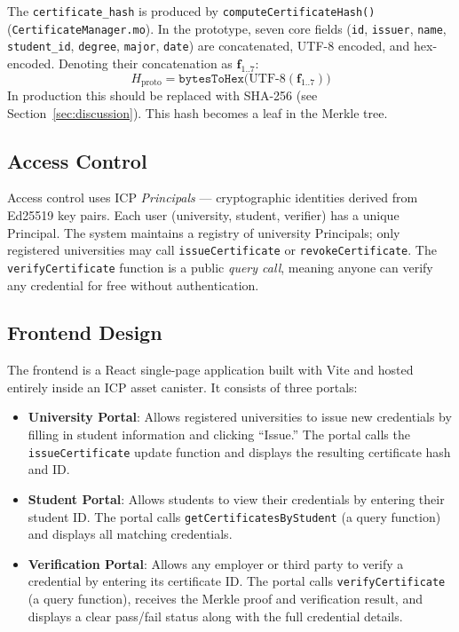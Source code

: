 \documentclass[journal]{IEEEtran}
\begin{document}
The \texttt{certificate\_hash} is produced by \texttt{computeCertificateHash()} (\texttt{CertificateManager.mo}). In the prototype, seven core fields (\texttt{id}, \texttt{issuer}, \texttt{name}, \texttt{student\_id}, \texttt{degree}, \texttt{major}, \texttt{date}) are concatenated, UTF-8 encoded, and hex-encoded. Denoting their concatenation as $\mathbf{f}_{1..7}$:
\begin{equation}
  H_{\text{proto}} = \texttt{bytesToHex}\bigl(\text{UTF-8}(\mathbf{f}_{1..7})\bigr)
  \label{eq:cert-hash}
\end{equation}
In production this should be replaced with SHA-256 (see Section~\ref{sec:discussion}). This hash becomes a leaf in the Merkle tree.

\subsection{Access Control}

Access control uses ICP \emph{Principals} — cryptographic identities derived from Ed25519 key pairs. Each user (university, student, verifier) has a unique Principal. The system maintains a registry of university Principals; only registered universities may call \texttt{issueCertificate} or \texttt{revokeCertificate}. The \texttt{verifyCertificate} function is a public \emph{query call}, meaning anyone can verify any credential for free without authentication.

\subsection{Frontend Design}

The frontend is a React single-page application built with Vite and hosted entirely inside an ICP asset canister. It consists of three portals:

\begin{itemize}[leftmargin=*]
  \item \textbf{University Portal}: Allows registered universities to issue new credentials by filling in student information and clicking ``Issue.'' The portal calls the \texttt{issueCertificate} update function and displays the resulting certificate hash and ID.
  \item \textbf{Student Portal}: Allows students to view their credentials by entering their student ID. The portal calls \texttt{getCertificatesByStudent} (a query function) and displays all matching credentials.
  \item \textbf{Verification Portal}: Allows any employer or third party to verify a credential by entering its certificate ID. The portal calls \texttt{verifyCertificate} (a query function), receives the Merkle proof and verification result, and displays a clear pass/fail status along with the full credential details.
\end{itemize}
\end{document}
